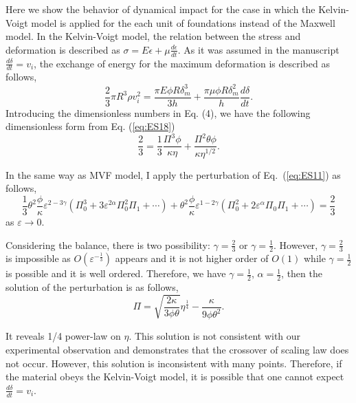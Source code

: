 \documentclass[aps,prl,superscriptaddress]{revtex4}  %
\begin{document}
Here we show the behavior of dynamical impact for the case in which the Kelvin-Voigt model is applied for the each unit of foundations instead of the Maxwell model. In the Kelvin-Voigt model, the relation between the stress and deformation is described as $\sigma = E \epsilon + \mu \frac{d \epsilon}{dt} $. As it was assumed in the manuscript $\frac{d \delta}{dt} = v_i$, the exchange of energy for the maximum deformation is described as follows,
\begin{equation}
\frac{2}{3} \pi R^3 \rho v_i^2   = \frac{ \pi E \phi R \delta_m^3}{3 h } +  \frac{ \pi \mu \phi R \delta_m^2}{ h }\frac{d \delta}{dt}.
\label{eq:ES18}
\end{equation}
Introducing the dimensionless numbers in Eq. (4), we have the following dimensionless form from Eq. (\ref{eq:ES18}) 
\begin{equation}
\frac{2}{3}  = \frac{1}{3} \frac{\Pi^3 \phi}{\kappa \eta} +  \frac{\Pi^2 \theta \phi}{\kappa \eta^{1/2}}. 
\label{eq:ES19}
\end{equation}

In the same way as MVF model, I apply the perturbation of Eq.~(\ref{eq:ES11}) as follows,
%
\begin{equation}
\frac{1}{3}\theta^2 \frac{\phi }{\kappa} \varepsilon^{2-3\gamma}  \left( \Pi_0^3  + 3 \varepsilon^{2\alpha} \Pi_0^2 \Pi_1 + \cdots \right)    + \theta^2 \frac{\phi }{\kappa} \varepsilon^{1-2\gamma}  \left( \Pi_0^2  + 2 \varepsilon^{\alpha} \Pi_0 \Pi_1 + \cdots \right) = \frac{2}{3}
\label{eq:ES20}
\end{equation}
%
as $\varepsilon \rightarrow 0$.

Considering the balance, there is two possibility: $\gamma = \frac{2}{3}$ or  $\gamma=\frac{1}{2}$. However, $\gamma = \frac{2}{3}$ is impossible as $O\left(\varepsilon^{- \frac{1}{3}}\right)$ appears and it is not higher order of $O\left(1\right)$ while $\gamma = \frac{1}{2}$ is possible and it is well ordered. Therefore, we have $\gamma = \frac{1}{2}$, $\alpha = \frac{1}{2}$, then the solution of the perturbation is  as follows,
\begin{equation}
\Pi = \sqrt{\frac{2\kappa}{3\phi \theta} } \eta^{\frac{1}{4}}  - \frac{\kappa}{9 \phi\theta^2}.
\label{eq:ES21}
\end{equation}

It reveals 1/4 power-law on $\eta$. This solution is not consistent with our experimental observation and demonstrates that the crossover of scaling law does not occur. However, this solution is inconsistent with many points. Therefore, if the material obeys the Kelvin-Voigt model, it is possible that one cannot expect $\frac{d \delta}{dt} = v_i$. 
\end{document}
